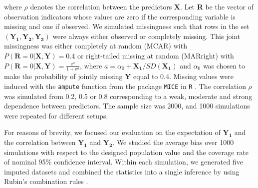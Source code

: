	where $\rho$ denotes the correlation between the predictors $\boldsymbol{X}$. Let \textbf{R} be the vector of observation indicators whose values are zero if the corresponding variable is missing and one if observed. We simulated missingness such that rows in the set $(\boldsymbol{Y_1, Y_2, Y_3})$ were always either observed or completely missing. This joint missingness was either completely at random (MCAR) with $P(\textbf{R}=0|\textbf{X}, \textbf{Y})=0.4$ or right-tailed missing at random (MARright) with $P(\textbf{R}=0|\textbf{X}, \textbf{Y})=\frac{\mathrm{e}^a}{1+\mathrm{e}^a}$, where $a=\alpha_0+\boldsymbol{X_1}/SD(\boldsymbol{X_1})$ and $\alpha_0$ was chosen to make the probability of jointly missing \textbf{Y} equal to 0.4. Missing values were induced with the \texttt{ampute} function \citep{Schouten2018} from the package \texttt{MICE} \citep{Buuren2011} in \texttt{R} \citep{R2018}. The correlation $\rho$ was simulated from 0.2, 0.5 or 0.8 corresponding to a weak, moderate and strong dependence between predictors. The sample size was 2000, and 1000 simulations were repeated for different setups. 
	
	For reasons of brevity, we focused our evaluation on the expectation of $\boldsymbol{Y_{1}}$ and the correlation between $\boldsymbol{Y_{1}}$ and $\boldsymbol{Y_{2}}$. We studied the average bias over 1000 simulations with respect to the designed population value and the coverage rate of nominal 95\% confidence interval. Within each simulation, we generated five imputed datasets and combined the statistics into a single inference by using Rubin's combination rules \citep[p.76]{RubinD1987}.  
	
